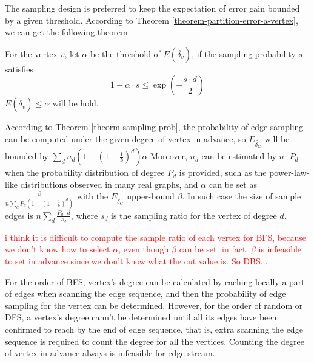 \documentclass{sig-alternate-2013}
\begin{document}
The sampling design is preferred to keep the expectation of error gain bounded by a given threshold.
According to Theorem \ref{theorem-partition-error-a-vertex}, we can get the following theorem.
\begin{theorem}\label{theorm-sampling-prob}
For the vertex $v$, let $\alpha$ be the threshold of $E(\tilde\delta_v)$, if the sampling probability $s$ satisfies
\begin{equation}\label{theorm-sampling-prob-eq}
1-\alpha \cdot s \leq \exp{(-\frac{s \cdot d}{2})}
\end{equation}
$E(\tilde\delta_v) \leq \alpha$ will be hold.
\end{theorem}

According to Theorem \ref{theorm-sampling-prob}, the probability of edge sampling can be computed under the given degree of vertex in advance, so $E_{\tilde{\delta_G}}$ will be bounded by
$\sum_{d} {n_d} {(1-(1-\frac{1}{k})^d) \alpha}$
Moreover, $n_d$ can be estimated by $n \cdot P_d$ when the probability distribution of degree $P_d$ is provided, such as the power-law-like  distributions observed in many real graphs, and $\alpha$ can be set as $\frac{\beta}{n\sum_{d} {P_d} {(1-(1-\frac{1}{k})^d)}} $ with the $E_{\tilde{\delta_G}}$ upper-bound $\beta$.
In such case the size of sample edges is $n \sum_{d}{\frac {P_d \cdot d}{s_d}} $, where $s_d$ is the sampling ratio for the vertex of degree $d$.

\textcolor{red}{i think it is difficult to compute the sample ratio of each vertex for BFS, because we don't know how to select $\alpha$, even though $\beta$ can be set. in fact, $\beta$ is infeasible to set in advance since we don't know what the cut value is. So DBS...  }

For the order of BFS, vertex's degree can be calculated by caching locally a part of edges when scanning the edge sequence, and then the probability of edge sampling for the vertex can be determined. However, for the order of random or DFS, a vertex's degree cann't be determined until all its edges have been confirmed to reach by the end of edge sequence, that is, extra scanning the edge sequence is required to count the degree for all the vertices. Counting the degree of vertex in advance always is infeasible for edge stream.
\end{document}
